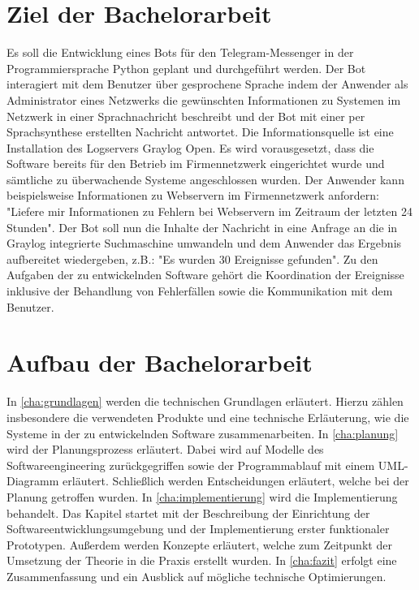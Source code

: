 \section{Ziel der Bachelorarbeit}

Es soll die Entwicklung eines Bots für den Telegram-Messenger in der Programmiersprache Python geplant und durchgeführt werden. Der Bot interagiert mit dem Benutzer über gesprochene Sprache indem der Anwender als Administrator eines Netzwerks die gewünschten Informationen zu Systemen im Netzwerk in einer Sprachnachricht beschreibt und der Bot mit einer per Sprachsynthese erstellten Nachricht antwortet. Die Informationsquelle ist eine Installation des Logservers Graylog Open. Es wird vorausgesetzt, dass die Software bereits für den Betrieb im Firmennetzwerk eingerichtet wurde und sämtliche zu überwachende Systeme angeschlossen wurden. Der Anwender kann beispielsweise Informationen zu Webservern im Firmennetzwerk anfordern: "Liefere mir Informationen zu Fehlern bei Webservern im Zeitraum der letzten 24 Stunden". Der Bot soll nun die Inhalte der Nachricht in eine Anfrage an die in Graylog integrierte Suchmaschine umwandeln und dem Anwender das Ergebnis aufbereitet wiedergeben, z.B.: "Es wurden 30 Ereignisse gefunden". Zu den Aufgaben der zu entwickelnden Software gehört die Koordination der Ereignisse inklusive der Behandlung von Fehlerfällen sowie die Kommunikation mit dem Benutzer.

\section{Aufbau der Bachelorarbeit}

In \autoref{cha:grundlagen} werden die technischen Grundlagen erläutert. Hierzu zählen insbesondere die verwendeten Produkte und eine technische Erläuterung, wie die Systeme in der zu entwickelnden Software zusammenarbeiten. In \autoref{cha:planung} wird der Planungsprozess erläutert. Dabei wird auf Modelle des Softwareengineering zurückgegriffen sowie der Programmablauf mit einem UML-Diagramm erläutert. Schließlich werden Entscheidungen erläutert, welche bei der Planung getroffen wurden. In \autoref{cha:implementierung} wird die Implementierung behandelt. Das Kapitel startet mit der Beschreibung der Einrichtung der Softwareentwicklungsumgebung und der Implementierung erster funktionaler Prototypen. Außerdem werden Konzepte erläutert, welche zum Zeitpunkt der Umsetzung der Theorie in die Praxis erstellt wurden. In \autoref{cha:fazit} erfolgt eine Zusammenfassung und ein Ausblick auf mögliche technische Optimierungen.